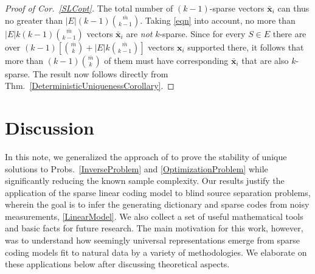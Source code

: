 \documentclass[9pt,twocolumn]{pnas-new}
\begin{document}
\begin{proof}[Proof of Cor.~\ref{SLCopt}]
The total number of $(k-1)$-sparse vectors $\mathbf{\bar x}_i$ can thus no greater than $|E|(k-1){ \bar m \choose k-1}$. Taking \eqref{eqn} into account, no more than $|E|k(k-1){ \bar m \choose k-1}$ vectors $\mathbf{\bar x}_i$ are \emph{not} $k$-sparse. Since for every $S \in E$ there are over $(k-1)\left[ {\bar m \choose k} + |E|k{ \bar m \choose k-1} \right]$ vectors $\mathbf{x}_i$ supported there, it follows that more than $(k-1){\bar m \choose k}$ of them must have corresponding $\mathbf{\bar x}_i$ that are also $k$-sparse. The result now follows directly from Thm.~\ref{DeterministicUniquenessCorollary}.
\end{proof}


 
\section{Discussion}\label{Discussion}

In this note, we generalized the approach of \cite{Hillar15} to prove the stability of unique solutions to Probs.~\ref{InverseProblem} and \ref{OptimizationProblem} while significantly reducing the known sample complexity. 
Our results justify the application of the sparse linear coding model to blind source separation problems, wherein the goal is to infer the generating dictionary and sparse codes from noisy measurements, \eqref{LinearModel}. We also collect a set of useful mathematical tools and basic facts for future research.
The main motivation for this work, however, was to understand how seemingly universal representations emerge from sparse coding models fit to natural data by a variety of methodologies. We elaborate on these applications below after discussing theoretical aspects.  %

\end{document}
